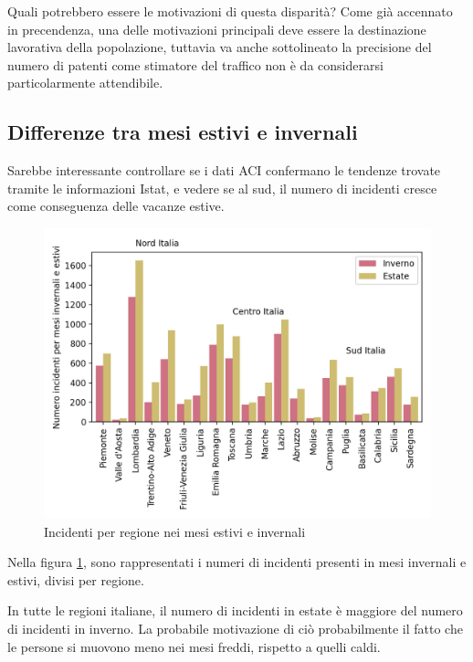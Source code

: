 \documentclass[a4paper,12pt]{report}
\begin{document}
Quali potrebbero essere le motivazioni di questa disparità?
Come già accennato in precendenza, una delle motivazioni principali 
deve essere la destinazione lavorativa della popolazione, tuttavia va anche sottolineato 
la precisione del numero di patenti come stimatore del traffico non è da considerarsi 
particolarmente attendibile.

\subsection{Differenze tra mesi estivi e invernali}

Sarebbe interessante controllare se i dati ACI confermano le tendenze trovate tramite 
le informazioni Istat, e vedere se al sud, il numero di incidenti cresce 
come conseguenza delle vacanze estive.

\begin{figure}
    \includegraphics[width=\linewidth]{../src/incidenti/incidenti_aci/mappe_regioni/estate_inverno.png}
    \caption{Incidenti per regione nei mesi estivi e invernali}
    \label{fig:estate-inverno}
\end{figure}

Nella figura \ref{fig:estate-inverno}, sono rappresentati i numeri di incidenti presenti 
in mesi invernali e estivi, divisi per regione.

In tutte le regioni italiane, il numero di incidenti in estate è maggiore del 
numero di incidenti in inverno. 
La probabile motivazione di ciò probabilmente il fatto che 
le persone si muovono meno nei mesi freddi, rispetto a quelli caldi.
\end{document}
